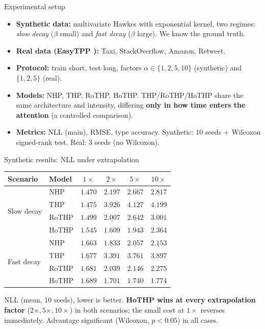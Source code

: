 \documentclass[aspectratio=169]{beamer}
\begin{document}
\begin{frame}{Experimental setup}
  \begin{itemize}
    \item \textbf{Synthetic data:} multivariate Hawkes with exponential kernel,
          two regimes: \emph{slow decay} ($\beta$ small) and \emph{fast decay}
          ($\beta$ large). We know the ground truth.
    \item \textbf{Real data (EasyTPP \cite{xue2024easytpp}):} Taxi, StackOverflow,
          Amazon, Retweet.
    \item \textbf{Protocol:} train short, test long, factors
          $\alpha \in \{1,2,5,10\}$ (synthetic) and $\{1,2,5\}$ (real).
    \item \textbf{Models:} NHP, THP, RoTHP, HoTHP. THP/RoTHP/HoTHP share the same
          architecture and intensity, differing \textbf{only in how time enters
          the attention} (a controlled comparison).
    \item \textbf{Metrics:} NLL (main), RMSE, type accuracy. Synthetic: 10 seeds +
          Wilcoxon signed-rank test. Real: 3 seeds (no Wilcoxon).
  \end{itemize}
\end{frame}

\begin{frame}{Synthetic results: NLL under extrapolation}
  \begin{table}
    \centering \small
    \begin{tabular}{llcccc}
      \toprule
      Scenario & Model & $1\times$ & $2\times$ & $5\times$ & $10\times$ \\
      \midrule
      \multirow{4}{*}{Slow decay}
        & NHP    & $\mathbf{1.470}$ & $2.197$ & $2.667$ & $\underline{2.817}$ \\
        & THP    & $\underline{1.475}$ & $3.926$ & $4.127$ & $4.199$ \\
        & RoTHP  & $1.499$ & $\underline{2.007}$ & $\underline{2.642}$ & $3.001$ \\
        & HoTHP  & $1.545$ & $\mathbf{1.609}$ & $\mathbf{1.943}$ & $\mathbf{2.364}$ \\
      \midrule
      \multirow{4}{*}{Fast decay}
        & NHP    & $\mathbf{1.663}$ & $\underline{1.833}$ & $\underline{2.057}$ & $\underline{2.153}$ \\
        & THP    & $\underline{1.677}$ & $3.391$ & $3.761$ & $3.897$ \\
        & RoTHP  & $1.681$ & $2.039$ & $2.146$ & $2.275$ \\
        & HoTHP  & $1.689$ & $\mathbf{1.701}$ & $\mathbf{1.740}$ & $\mathbf{1.774}$ \\
      \bottomrule
    \end{tabular}
  \end{table}
  \vspace{0.2em}
  {\small NLL (mean, 10 seeds), lower is better. \textbf{HoTHP wins at every
  extrapolation factor} ($2\times, 5\times, 10\times$) in both scenarios; the small
  cost at $1\times$ reverses immediately. Advantage significant (Wilcoxon,
  $p<0.05$) in all cases.}
\end{frame}
\end{document}
